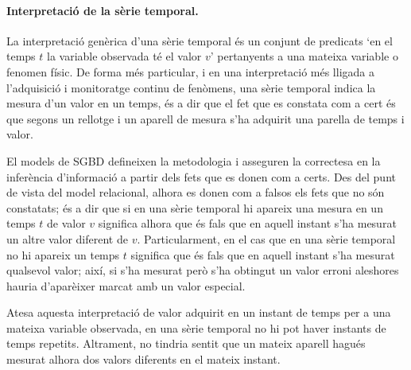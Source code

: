 \paragraph{Interpretació de la sèrie temporal.} 
La interpretació genèrica d'una sèrie temporal és un conjunt de
predicats `en el temps $t$ la variable observada té el valor $v$'
pertanyents a una mateixa variable o fenomen físic.  De forma més
particular, i en una interpretació més lligada a l'adquisició i
monitoratge continu de fenòmens, una sèrie temporal indica la mesura
d'un valor en un temps, és a dir que el fet que es constata com a cert
és que segons un rellotge i un aparell de mesura s'ha adquirit una
parella de temps i valor.  


El models de \gls{SGBD} defineixen la metodologia i asseguren la
correctesa en la inferència d'informació a partir dels fets que es
donen com a certs. Des del punt de vista del model relacional, alhora
es donen com a falsos els fets que no són constatats; és a dir que si
en una sèrie temporal hi apareix una mesura en un temps $t$ de valor
$v$ significa alhora que és fals que en aquell instant s'ha mesurat un
altre valor diferent de $v$. Particularment, en el cas que en una
sèrie temporal no hi apareix un temps $t$ significa que és fals que en
aquell instant s'ha mesurat qualsevol valor; així, si s'ha mesurat
però s'ha obtingut un valor erroni aleshores hauria d'aparèixer marcat
amb un valor especial.

Atesa aquesta interpretació de valor adquirit en un instant de
temps per a una mateixa variable observada, en una sèrie temporal no
hi pot haver instants de temps repetits. Altrament, no tindria sentit
que un mateix aparell hagués mesurat alhora dos valors diferents en el
mateix instant.
  






